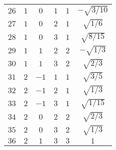 \begin{table}
\begin{center}
\begin{tabular}{|c|c|c|c|c|c|}
$26$ & $1$ & $0$ & $1$ & $1$ & $-\sqrt{3/10}$ \\ 
$27$ & $1$ & $0$ & $2$ & $1$ & $\sqrt{1/6}$ \\ 
$28$ & $1$ & $0$ & $3$ & $1$ & $\sqrt{8/15}$ \\ 
$29$ & $1$ & $1$ & $2$ & $2$ & $-\sqrt{1/3}$ \\ 
$30$ & $1$ & $1$ & $3$ & $2$ & $\sqrt{2/3}$ \\ 
$31$ & $2$ & $-1$ & $1$ & $1$ & $\sqrt{3/5}$ \\ 
$32$ & $2$ & $-1$ & $2$ & $1$ & $\sqrt{1/3}$ \\ 
$33$ & $2$ & $-1$ & $3$ & $1$ & $\sqrt{1/15}$ \\ 
$34$ & $2$ & $0$ & $2$ & $2$ & $\sqrt{2/3}$ \\ 
$35$ & $2$ & $0$ & $3$ & $2$ & $\sqrt{1/3}$ \\ 
$36$ & $2$ & $1$ & $3$ & $3$ & $1$ \\ 
\hline 
\end{tabular}
\end{center}
\end{table}

